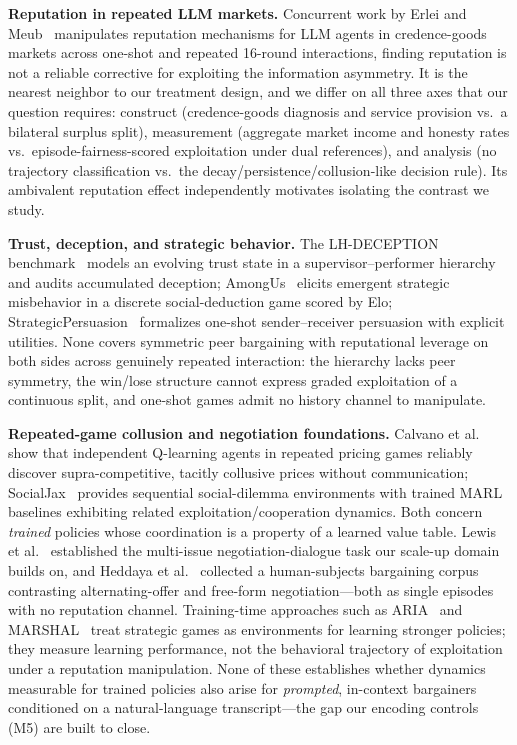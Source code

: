 \documentclass[conference]{IEEEtran}
\begin{document}
\textbf{Reputation in repeated LLM markets.} Concurrent work by Erlei and
Meub~\cite{erlei2026llmmarkets} manipulates reputation mechanisms for LLM
agents in credence-goods markets across one-shot and repeated 16-round
interactions, finding reputation is not a reliable corrective for exploiting
the information asymmetry. It is the nearest neighbor to our treatment
design, and we differ on all three axes that our question requires: construct
(credence-goods diagnosis and service provision vs.\ a bilateral surplus
split), measurement (aggregate market income and honesty rates vs.\
episode-fairness-scored exploitation under dual references), and analysis (no
trajectory classification vs.\ the decay/persistence/collusion-like decision
rule). Its ambivalent reputation effect independently motivates isolating the
contrast we study.

\textbf{Trust, deception, and strategic behavior.} The LH-DECEPTION
benchmark~\cite{lhdeception} models an evolving trust state in a
supervisor--performer hierarchy and audits accumulated deception;
AmongUs~\cite{amongus} elicits emergent strategic misbehavior in a discrete
social-deduction game scored by Elo; StrategicPersuasion~\cite{strategicpersuasion}
formalizes one-shot sender--receiver persuasion with explicit utilities. None
covers symmetric peer bargaining with reputational leverage on both sides
across genuinely repeated interaction: the hierarchy lacks peer symmetry, the
win/lose structure cannot express graded exploitation of a continuous split,
and one-shot games admit no history channel to manipulate.

\textbf{Repeated-game collusion and negotiation foundations.}
Calvano et al.~\cite{calvano2020} show that independent Q-learning agents in
repeated pricing games reliably discover supra-competitive, tacitly collusive
prices without communication; SocialJax~\cite{socialjax} provides sequential
social-dilemma environments with trained MARL baselines exhibiting related
exploitation/cooperation dynamics. Both concern \emph{trained} policies whose
coordination is a property of a learned value table.
Lewis et al.~\cite{lewis2017} established the multi-issue negotiation-dialogue
task our scale-up domain builds on, and Heddaya et al.~\cite{heddaya2023}
collected a human-subjects bargaining corpus contrasting alternating-offer and
free-form negotiation---both as single episodes with no reputation channel.
Training-time approaches such as ARIA~\cite{aria} and
MARSHAL~\cite{marshal} treat strategic games as environments for learning
stronger policies; they measure learning performance, not the behavioral
trajectory of exploitation under a reputation manipulation. None of these
establishes whether dynamics measurable for trained policies also arise for
\emph{prompted}, in-context bargainers conditioned on a natural-language
transcript---the gap our encoding controls (M5) are built to close.
\end{document}
